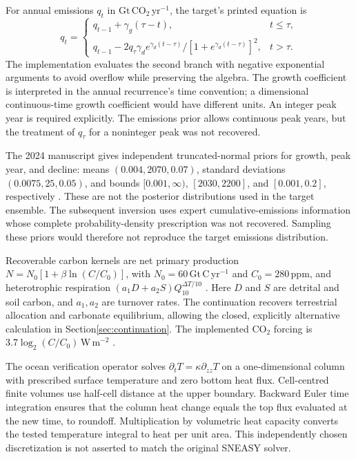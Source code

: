 \documentclass[11pt]{article}
\begin{document}
For annual emissions $q_t$ in Gt\,CO$_2$\,yr$^{-1}$, the target's printed equation is
\begin{equation}
q_t=\begin{cases}
q_{t-1}+\gamma_g(\tau-t),& t\leq\tau,\\
q_{t-1}-2q_\tau\gamma_d e^{\gamma_d(t-\tau)}
             /[1+e^{\gamma_d(t-\tau)}]^2,&t>\tau.
\end{cases}
\label{eq:emissions}
\end{equation}
The implementation evaluates the second branch with negative exponential
arguments to avoid overflow while preserving the algebra. The growth coefficient
is interpreted in the annual recurrence's time convention; a dimensional
continuous-time growth coefficient would have different units. An integer peak
year is required explicitly. The emissions prior allows continuous peak years,
but the treatment of $q_\tau$ for a noninteger peak was not recovered.

The 2024 manuscript gives independent truncated-normal priors for growth,
peak year, and decline: means $(0.004, 2070, 0.07)$, standard deviations
$(0.0075, 25, 0.05)$, and bounds $[0.001,\infty)$, $[2030, 2200]$, and
$[0.001, 0.2]$, respectively \cite{darnell}. These are not the posterior
distributions used in the target ensemble. The subsequent inversion uses expert
cumulative-emissions information whose complete probability-density prescription
was not recovered. Sampling these priors would therefore not reproduce the
target emissions distribution.

Recoverable carbon kernels are net primary production
$N=N_0[1+\beta\ln(C/C_0)]$, with $N_0=60$\,Gt\,C\,yr$^{-1}$ and
$C_0=280$\,ppm, and heterotrophic respiration
$(a_1D+a_2S)Q_{10}^{\Delta T/10}$ \cite{ricciuto}. Here $D$ and $S$ are
detrital and soil carbon, and $a_1,a_2$ are turnover rates. The continuation
recovers terrestrial allocation and carbonate equilibrium, allowing the closed,
explicitly alternative calculation in Section\ref{sec:continuation}.
The implemented CO$_2$ forcing is $3.7\log_2(C/C_0)$\,W\,m$^{-2}$
\cite{urban}.

The ocean verification operator solves
$\partial_t T=\kappa\partial_{zz}T$ on a one-dimensional column with prescribed
surface temperature and zero bottom heat flux. Cell-centred finite volumes use
half-cell distance at the upper boundary. Backward Euler time integration
ensures that the column heat change equals the top flux evaluated at the new
time, to roundoff. Multiplication by volumetric heat capacity converts the
tested temperature integral to heat per unit area. This independently chosen
discretization is not asserted to match the original SNEASY solver.
\end{document}
